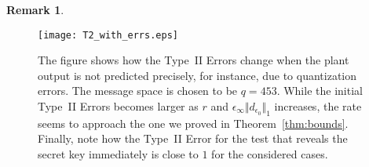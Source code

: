 \documentclass[journal, twoside, web]{ieeecolorpreprint}
\newtheorem{rem}{Remark}
\begin{document}
\begin{rem}
    \end{rem}

\begin{figure}
\hspace{-0.4cm}\texttt{[image: T2\_with\_errs.eps]}
    \caption{The figure shows how the Type~II Errors change when the plant output is not predicted precisely, for instance, due to quantization errors. The message space is chosen to be $q=453$. While the initial Type~II Errors becomes larger as $r$ and $\epsilon_\infty \Vert d_{\epsilon_0}\Vert_1$ increases, the rate seems to approach the one we proved in Theorem~\ref{thm:bounds}. Finally, note how the Type~II Error for the test that reveals the secret key immediately is close to $1$ for the considered cases.}
    \label{fig:T2errs}
\end{figure}
\end{document}
